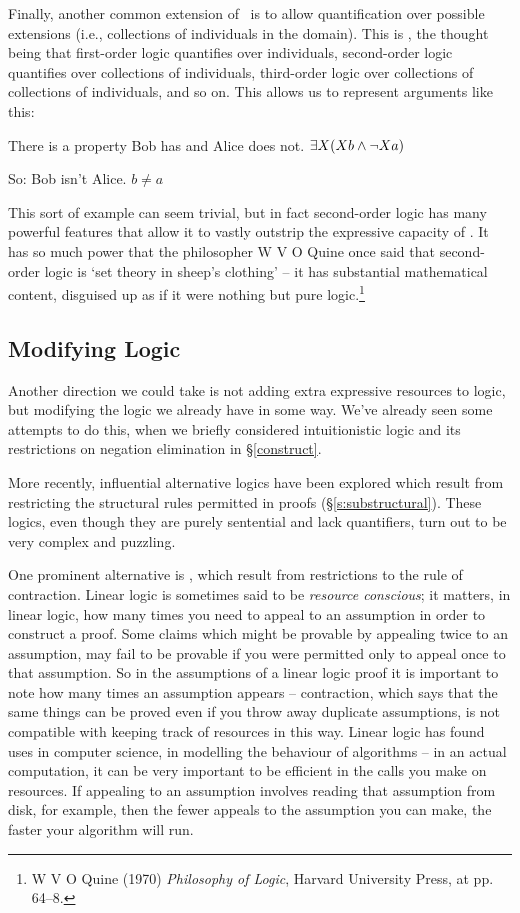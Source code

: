 Finally, another common extension of \FOL\ is to allow quantification over possible extensions (i.e., collections of individuals in the domain). This is , the thought being that first-order logic quantifies over individuals, second-order logic quantifies over collections of individuals, third-order logic over collections of collections of individuals, and so on. This allows us to represent arguments like this: \begin{earg}
	\item There is a property Bob has and Alice does not. $\exists X (Xb \wedge \neg Xa)$
	\item[So:] Bob isn't Alice. $b≠a$
\end{earg}
This sort of example can seem trivial, but in fact second-order logic has many powerful features that allow it to vastly outstrip the expressive capacity of \FOL. It has so much power that the philosopher W V O Quine once said that second-order logic is `set theory in sheep's clothing' – it has substantial mathematical content, disguised up as if it were nothing but pure logic.\footnote{W V O Quine (1970) \emph{Philosophy of Logic}, Harvard University Press, at pp. 64–8.}

\subsection{Modifying Logic}\label{s:modifying}

Another direction we could take is not adding extra expressive resources to logic, but modifying the logic we already have in some way. We've already seen some attempts to do this, when we briefly considered intuitionistic logic and its restrictions on negation elimination in §\ref{construct}. 

More recently, influential alternative logics have been explored which result from restricting the structural rules permitted in proofs (§\ref{s:substructural}). These logics, even though they are purely sentential and lack quantifiers, turn out to be very complex and puzzling.

One prominent alternative is , which result from restrictions to the rule of contraction. Linear logic is sometimes said to be \emph{resource conscious}; it matters, in linear logic, how many times you need to appeal to an assumption in order to construct a proof. Some claims which might be provable by appealing twice to an assumption, may fail to be provable if you were permitted only to appeal once to that assumption. So in the assumptions of a linear logic proof it is important to note how many times an assumption appears – contraction, which says that the same things can be proved even if you throw away duplicate assumptions, is not compatible with keeping track of resources in this way. Linear logic has found uses in computer science, in modelling the behaviour of algorithms – in an actual computation, it can be very important to be efficient in the calls you make on resources. If appealing to an assumption involves reading that assumption from disk, for example, then the fewer appeals to the assumption you can make, the faster your algorithm will run.

